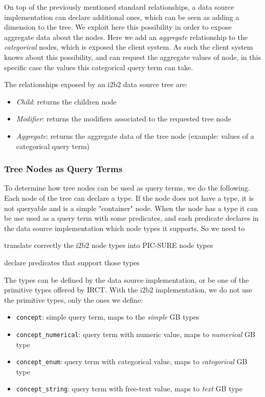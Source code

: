 On top of the previously mentioned standard relationships, a data source implementation can declare additional ones, which can be seen as adding a dimension to the tree.
We exploit here this possibility in order to expose aggregate data about the nodes.
Here we add an \emph{aggregate} relationship to the \emph{categorical} nodes, which is exposed the client system.
As such the client system knows about this possibility, and can request the aggregate values of node, in this specific case the values this categorical query term can take.

The relationships exposed by an i2b2 data source tree are:
\begin{itemize}
    \item \emph{Child}: returns the children node 
    \item \emph{Modifier}: returns the modifiers associated to the requested tree node
    \item \emph{Aggregate}: returns the aggregate data of the tree node (example: values of a categorical query term)
\end{itemize}


\subsubsection{Tree Nodes as Query Terms}

To determine how tree nodes can be used as query terms, we do the following.
Each node of the tree can declare a type. 
If the node does not have a type, it is not queryable and is a simple "container" node.
When the node has a type it can be use used as a query term with some predicates, and each predicate declares in the data source implementation which node types it supports.
So we need to 
\begin{enumerate*}
    \item translate correctly the i2b2 node types into PIC-SURE node types
    \item declare predicates that support those types
\end{enumerate*}

The types can be defined by the data source implementation, or be one of the primitive types offered by IRCT.
With the i2b2 implementation, we do not use the primitive types, only the ones we define:
\begin{samepage}
\begin{itemize}
    \item \verb|concept|: simple query term, maps to the \emph{simple} GB types
    \item \verb|concept_numerical|: query term with numeric value, maps to \emph{numerical} GB type
    \item \verb|concept_enum|: query term with categorical value, maps to \emph{categorical} GB type
    \item \verb|concept_string|: query term with free-text value, maps to \emph{text} GB type
\end{itemize}
\end{samepage}

